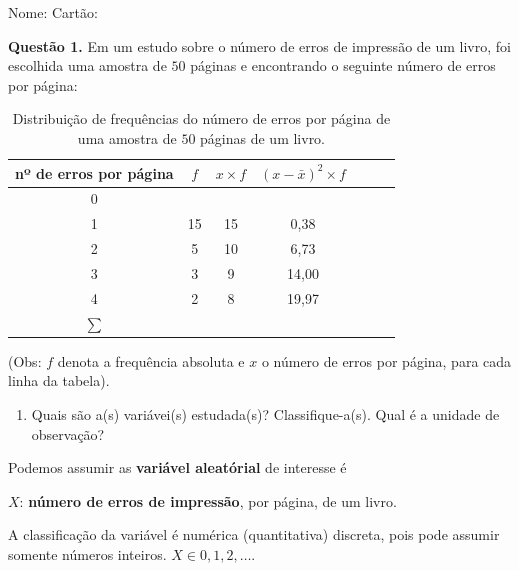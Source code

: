 \documentclass[
]{article}
\author{}
\date{\vspace{-2.5em}}
\providecommand{\tightlist}{%
  \setlength{\itemsep}{0pt}\setlength{\parskip}{0pt}}
\begin{document}
\addtolength{\headheight}{1.0cm}
\pagestyle{fancyplain} 
\renewcommand{\headrulewidth}{0pt}

\vspace{0.5cm}

Nome: \hspace{10cm} Cartão:

\vspace{1.0cm}

\textbf{Questão 1.} Em um estudo sobre o número de erros de impressão de
um livro, foi escolhida uma amostra de \(50\) páginas e encontrando o
seguinte número de erros por página:

\begin{table}[h!]
  \centering
  \caption{Distribuição de frequências do número de erros por página de uma amostra de $50$ páginas de um livro.}

 \begin{tabular}{c|c|c|c|p{2cm}|p{2cm}|p{2cm}}
 \hline
 nº de erros por página & $f$ & $x \times f$ & $(x - \bar{x})^2 \times f$ & & & \\
 \hline
 0 &    &    &  & & & \\
 1 & 15 & 15 & 0,38 & & & \\
 2 & 5  & 10  & 6,73 & & & \\
 3 & 3  & 9  & 14,00 & & & \\
 4 & 2  & 8  & 19,97 & & & \\
 \hline
 $\sum$ &  &  &  & & & \\
 \hline
 \end{tabular}
\end{table}

(Obs: \(f\) denota a frequência absoluta e \(x\) o número de erros por
página, para cada linha da tabela).

\begin{enumerate}
\def\labelenumi{\alph{enumi}.}
\tightlist
\item
  Quais são a(s) variávei(s) estudada(s)? Classifique-a(s). Qual é a
  unidade de observação?
\end{enumerate}

Podemos assumir as \textbf{variável aleatórial} de interesse é

\(X\): \textbf{número de erros de impressão}, por página, de um livro.

A classificação da variável é numérica (quantitativa) discreta, pois
pode assumir somente números inteiros. \(X \in {0,1,2,\ldots}\).
\end{document}
